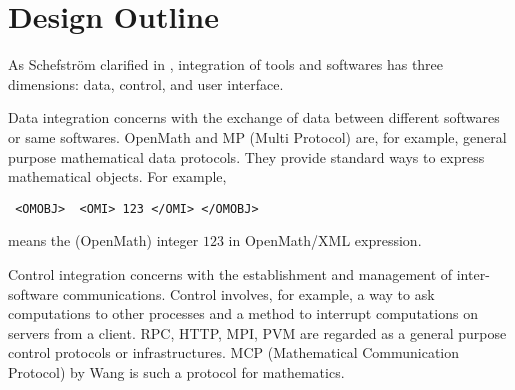 
\section{Design Outline} 

As Schefstr\"om clarified in \cite{schefstrom},
integration of tools and softwares has three dimensions:
data, control, and user interface.

Data integration concerns with the exchange of data between different
softwares or same softwares.
OpenMath \cite{OpenMath} and MP (Multi Protocol) \cite{GKW} are,
for example, general purpose mathematical data protocols.
They provide standard ways to express mathematical objects.
For example,
\begin{verbatim}
 <OMOBJ>  <OMI> 123 </OMI> </OMOBJ>
\end{verbatim}
means the (OpenMath) integer $123$ in OpenMath/XML expression.

Control integration concerns with the establishment and management of
inter-software communications.
Control involves, for example, a way to ask computations to other processes
and a method to interrupt computations on servers from a client.
RPC, HTTP, MPI, PVM are regarded as a general purpose control protocols or
infrastructures.
MCP (Mathematical Communication Protocol)
by Wang \cite{iamc} is such a protocol for mathematics.

